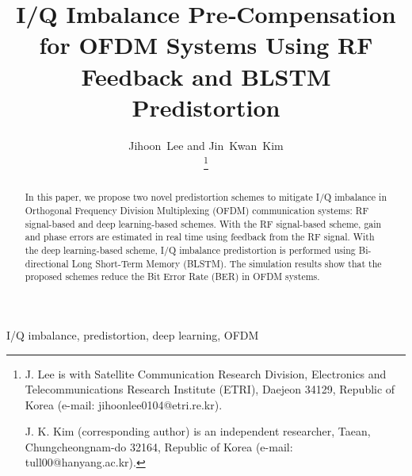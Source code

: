 \documentclass[lettersize,journal]{IEEEtran}
\begin{document}
\title{\huge I/Q Imbalance Pre‑Compensation for OFDM Systems Using RF Feedback and BLSTM Predistortion}

\author{Jihoon~Lee and Jin~Kwan~Kim%

\thanks{
J. Lee is with Satellite Communication Research Division, Electronics and Telecommunications Research Institute (ETRI), Daejeon 34129, Republic of Korea (e-mail: jihoonlee0104@etri.re.kr).

J. K. Kim (corresponding author) is an independent researcher, Taean, Chungcheongnam-do 32164, Republic of Korea (e-mail: tull00@hanyang.ac.kr).
}

}



\maketitle

\begin{abstract}
In this paper, we propose two novel predistortion schemes to mitigate I/Q imbalance in Orthogonal Frequency Division Multiplexing (OFDM) communication systems: RF signal-based and deep learning-based schemes.
With the RF signal-based scheme, gain and phase errors are estimated in real time using feedback from the RF signal.
With the deep learning-based scheme, I/Q imbalance predistortion is performed using Bi-directional Long Short-Term Memory (BLSTM). The simulation results show that the proposed schemes reduce the Bit Error Rate (BER) in OFDM systems.
\end{abstract}

\begin{IEEEkeywords}
I/Q imbalance, predistortion, deep learning, OFDM
\end{IEEEkeywords}
\end{document}
